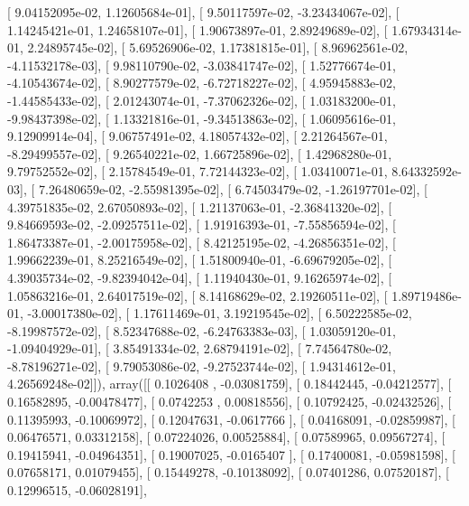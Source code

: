\documentclass{article}
\begin{document}
       [  9.04152095e-02,   1.12605684e-01],
       [  9.50117597e-02,  -3.23434067e-02],
       [  1.14245421e-01,   1.24658107e-01],
       [  1.90673897e-01,   2.89249689e-02],
       [  1.67934314e-01,   2.24895745e-02],
       [  5.69526906e-02,   1.17381815e-01],
       [  8.96962561e-02,  -4.11532178e-03],
       [  9.98110790e-02,  -3.03841747e-02],
       [  1.52776674e-01,  -4.10543674e-02],
       [  8.90277579e-02,  -6.72718227e-02],
       [  4.95945883e-02,  -1.44585433e-02],
       [  2.01243074e-01,  -7.37062326e-02],
       [  1.03183200e-01,  -9.98437398e-02],
       [  1.13321816e-01,  -9.34513863e-02],
       [  1.06095616e-01,   9.12909914e-04],
       [  9.06757491e-02,   4.18057432e-02],
       [  2.21264567e-01,  -8.29499557e-02],
       [  9.26540221e-02,   1.66725896e-02],
       [  1.42968280e-01,   9.79752552e-02],
       [  2.15784549e-01,   7.72144323e-02],
       [  1.03410071e-01,   8.64332592e-03],
       [  7.26480659e-02,  -2.55981395e-02],
       [  6.74503479e-02,  -1.26197701e-02],
       [  4.39751835e-02,   2.67050893e-02],
       [  1.21137063e-01,  -2.36841320e-02],
       [  9.84669593e-02,  -2.09257511e-02],
       [  1.91916393e-01,  -7.55856594e-02],
       [  1.86473387e-01,  -2.00175958e-02],
       [  8.42125195e-02,  -4.26856351e-02],
       [  1.99662239e-01,   8.25216549e-02],
       [  1.51800940e-01,  -6.69679205e-02],
       [  4.39035734e-02,  -9.82394042e-04],
       [  1.11940430e-01,   9.16265974e-02],
       [  1.05863216e-01,   2.64017519e-02],
       [  8.14168629e-02,   2.19260511e-02],
       [  1.89719486e-01,  -3.00017380e-02],
       [  1.17611469e-01,   3.19219545e-02],
       [  6.50222585e-02,  -8.19987572e-02],
       [  8.52347688e-02,  -6.24763383e-03],
       [  1.03059120e-01,  -1.09404929e-01],
       [  3.85491334e-02,   2.68794191e-02],
       [  7.74564780e-02,  -8.78196271e-02],
       [  9.79053086e-02,  -9.27523744e-02],
       [  1.94314612e-01,   4.26569248e-02]]), array([[ 0.1026408 , -0.03081759],
       [ 0.18442445, -0.04212577],
       [ 0.16582895, -0.00478477],
       [ 0.0742253 ,  0.00818556],
       [ 0.10792425, -0.02432526],
       [ 0.11395993, -0.10069972],
       [ 0.12047631, -0.0617766 ],
       [ 0.04168091, -0.02859987],
       [ 0.06476571,  0.03312158],
       [ 0.07224026,  0.00525884],
       [ 0.07589965,  0.09567274],
       [ 0.19415941, -0.04964351],
       [ 0.19007025, -0.0165407 ],
       [ 0.17400081, -0.05981598],
       [ 0.07658171,  0.01079455],
       [ 0.15449278, -0.10138092],
       [ 0.07401286,  0.07520187],
       [ 0.12996515, -0.06028191],
\end{document}
